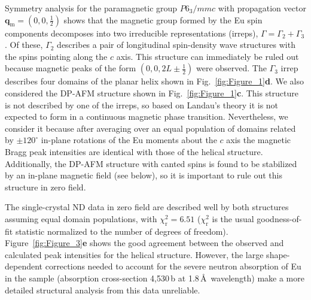 \documentclass[aps,prl,amsmath,amssymb,amstext,citeautoscript,punctuation,nofootinbib,superscriptaddress,twocolumn]{revtex4-1}
\begin{document}
Symmetry analysis for the paramagnetic group $P6_3/mmc$ with propagation vector $\textbf{q}_\textrm{m} = \left(0,0,\frac{1}{2}\right)$ shows that the magnetic group formed by the Eu spin components decomposes into two irreducible representations (irreps), $\Gamma = \Gamma_2 + \Gamma_3$. Of these, $\Gamma_2$ describes a pair of longitudinal spin-density wave structures with the spins pointing along the $c$ axis. This structure can immediately be ruled out  because  magnetic peaks of the form $(0,0,2L\pm \frac{1}{2})$ were observed. The $\Gamma_3$ irrep describes four domains of the planar helix shown in Fig.~\ref{fig:Figure_1}\textbf{d}. We also considered the DP-AFM structure shown in Fig.~\ref{fig:Figure_1}\textbf{c}. This structure is not described by one of the irreps, so based on Landau's theory it is not expected to form in a continuous magnetic phase transition. Nevertheless, we consider it because after averaging over an equal population of domains related by $\pm 120^\circ$ in-plane rotations of the Eu moments about the $c$ axis the magnetic Bragg peak intensities are identical with those of the helical structure. Additionally, the DP-AFM structure with canted spins is found to be stabilized by an in-plane magnetic field (see below), so it is important to rule out this structure in zero field.


 The single-crystal ND data in zero field are described well by both structures assuming equal domain populations, with $\chi_\textrm{r}^2 = 6.51$ ($\chi_\textrm{r}^2$ is the usual goodness-of-fit statistic normalized to the number of degrees of freedom).  %
 Figure~\ref{fig:Figure_3}\textbf{e} shows the good agreement between the observed and calculated peak intensities for the helical structure. However, the large shape-dependent corrections needed to account for the severe neutron absorption of Eu in the sample (absorption cross-section 4,530\,b at 1.8\,\AA \ wavelength) make a more detailed structural analysis from this data unreliable.
\end{document}
